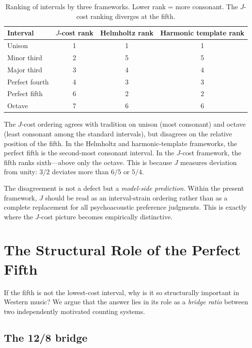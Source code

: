 \documentclass[11pt,a4paper]{article}
\begin{document}
\begin{table}[H]
\centering
\caption{Ranking of intervals by three frameworks.  Lower rank = more
consonant.  The $J$-cost ranking diverges at the fifth.}
\label{tab:compare}
\begin{tabular}{@{}lccc@{}}
\toprule
Interval & $J$-cost rank & Helmholtz rank & Harmonic template rank \\
\midrule
Unison        & 1 & 1 & 1 \\
Minor third   & 2 & 5 & 5 \\
Major third   & 3 & 4 & 4 \\
Perfect fourth& 4 & 3 & 3 \\
Perfect fifth & 6 & 2 & 2 \\
Octave        & 7 & 6 & 6 \\
\bottomrule
\end{tabular}
\end{table}

\noindent The $J$-cost ordering agrees with tradition on unison (most
consonant) and octave (least consonant among the standard intervals),
but disagrees on the relative position of the fifth.  In the
Helmholtz and harmonic-template frameworks, the perfect fifth is the
second-most consonant interval.  In the $J$-cost framework, the fifth
ranks sixth---above only the octave.  This is because $J$ measures
deviation from unity: $3/2$ deviates more than $6/5$ or $5/4$.

The disagreement is not a defect but a \emph{model-side prediction}.
Within the present framework, $J$ should be read as an interval-strain
ordering rather than as a complete replacement for all psychoacoustic
preference judgments.  This is exactly where the $J$-cost picture
becomes empirically distinctive.

\section{The Structural Role of the Perfect Fifth}
\label{sec:fifth}

If the fifth is not the lowest-cost interval, why is it so
structurally important in Western music?  We argue that the answer
lies in its role as a \emph{bridge ratio} between two independently
motivated counting systems.

\subsection{The 12/8 bridge}
\end{document}
